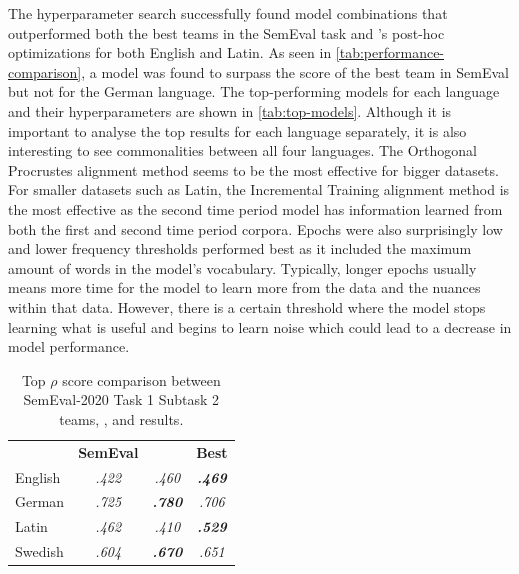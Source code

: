 The hyperparameter search successfully found model combinations that outperformed both the best teams in the SemEval task and \citet{kaiser-etal-2020-ims}’s post-hoc optimizations for both English and Latin. As seen in \autoref{tab:performance-comparison}, a model was found to surpass the score of the best team in SemEval but not \citet{kaiser-etal-2020-ims} for the German language. The top-performing models for each language and their hyperparameters are shown in \autoref{tab:top-models}. Although it is important to analyse the top results for each language separately, it is also interesting to see commonalities between all four languages. The Orthogonal Procrustes alignment method seems to be the most effective for bigger datasets. For smaller datasets such as Latin, the Incremental Training alignment method is the most effective as the second time period model has information learned from both the first and second time period corpora. Epochs were also surprisingly low and lower frequency thresholds performed best as it included the maximum amount of words in the model’s vocabulary. Typically, longer epochs usually means more time for the model to learn more from the data and the nuances within that data. However, there is a certain threshold where the model stops learning what is useful and begins to learn noise which could lead to a decrease in model performance. 


\begin{table}[h]
\centering
\begin{tabular}{lccc} 
\toprule
\textbf{ } & \textbf{SemEval } & \textbf{\citet{kaiser-etal-2020-ims} }         & \textbf{Best }            \\
English    & \textit{ .422 }   & \textit{ .460 }          & \textbf{\textit{ .469 }}  \\
German     & \textit{ .725 }   & \textit{\textbf{ .780 }} & \textit{ .706 }           \\
Latin      & \textit{ .462 }   & \textit{ .410 }          & \textbf{\textit{ .529 }}  \\
Swedish    & \textit{ .604 }   & \textit{\textbf{ .670 }} & \textit{ .651 }           \\
\bottomrule
\end{tabular}
\caption{Top $\rho$ score comparison between SemEval-2020 Task 1 Subtask 2 teams, \citet{kaiser-etal-2020-ims}, and results.}
\label{tab:performance-comparison}
\end{table}


